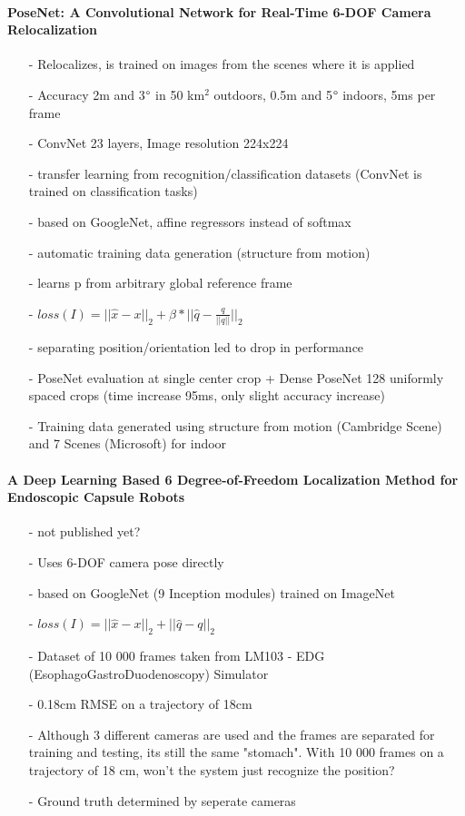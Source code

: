 	\paragraph{PoseNet: A Convolutional Network for Real-Time 6-DOF Camera Relocalization \cite{Kendall}}
	\begin{itemize}
			\item[-] Relocalizes, is trained on images from the scenes where it is applied	\item[-] Accuracy 2m and 3$\degree$  in 50 km$^2$ outdoors, 0.5m and 5$\degree$ indoors, 5ms per frame
		\item[-] ConvNet 23 layers, Image resolution 224x224
		\item[-] transfer learning from recognition/classification datasets (ConvNet is trained on classification tasks)
		\item[-] based on GoogleNet, affine regressors instead of softmax\item[-] automatic training data generation (structure from motion)
		\item[-] learns p from arbitrary global reference frame
		\item[-] $loss(I) = || \hat{x}-x||_2 + \beta*||\hat{q}-\frac{q}{||q||}||_2$
		\item[-] separating position/orientation led to drop in performance
		\item[-] PoseNet evaluation at single center crop + Dense PoseNet 128 uniformly spaced crops (time increase 95ms, only slight accuracy increase)
		\item[-] Training data generated using structure from motion (Cambridge Scene) and 7 Scenes (Microsoft) for indoor

	\end{itemize}
	 \paragraph{A Deep Learning Based 6 Degree-of-Freedom
	 	Localization Method for Endoscopic Capsule Robots \cite{Turan2017}}
	 	\begin{itemize}
	 		\item[-] not published yet?
	 		\item[-] Uses 6-DOF camera pose directly
	 		\item[-] based on GoogleNet (9 Inception modules) trained on ImageNet
	 		\item[-] $loss(I) = ||\hat{x}-x||_2 + ||\hat{q}-q||_2$
	 		\item[-] Dataset of 10 000 frames taken from LM103 - EDG (EsophagoGastroDuodenoscopy) Simulator
	 		\item[-] 0.18cm RMSE on a trajectory of 18cm
	 		\item[-] Although 3 different cameras are used and the frames are separated for training and testing, its still the same "stomach". With 10 000 frames on a trajectory of 18 cm, won't the system just recognize the position?
	 		\item[-] Ground truth determined by seperate cameras 
	 	\end{itemize}
